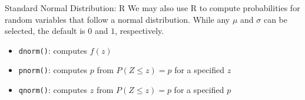 \documentclass[
  ignorenonframetext,
]{beamer}
\providecommand{\tightlist}{%
  \setlength{\itemsep}{0pt}\setlength{\parskip}{0pt}}
\begin{document}
\begin{frame}[fragile]{Standard Normal Distribution: R}
\protect{}\label{standard-normal-distribution-r}
We may also use R to compute probabilities for random variables that
follow a normal distribution. While any \(\mu\) and \(\sigma\) can be
selected, the default is \(0\) and \(1\), respectively.

\begin{itemize}
\tightlist
\item
  \texttt{dnorm()}: computes \(f(z)\)
\item
  \texttt{pnorm()}: computes \(p\) from \(P(Z\leq z)=p\) for a specified
  \(z\)
\item
  \texttt{qnorm()}: computes \(z\) from \(P(Z\leq z)=p\) for a specified
  \(p\)
\end{itemize}
\end{frame}
\end{document}
